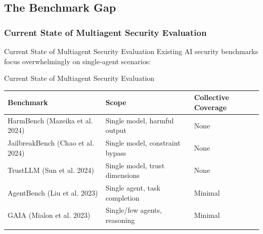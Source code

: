 \documentclass[
  ignorenonframetext,
]{beamer}
\newcounter{none} %
\begin{document}
\begin{frame}
\end{frame}

\subsection{The Benchmark Gap}\label{sec:benchmark-gap}

\subsubsection{Current State of Multiagent Security
Evaluation}\label{sec:current-benchmarks}

\begin{frame}[allowframebreaks]{Current State of Multiagent Security
Evaluation}
Existing AI security benchmarks focus overwhelmingly on single-agent
scenarios:

\end{frame}

\begin{frame}[allowframebreaks]{Current State of Multiagent Security
Evaluation}
{\def\LTcaptype{none} %
\begin{longtable}[]{@{}
  >{\raggedright\arraybackslash}p{}
  >{\raggedright\arraybackslash}p{}
  >{\raggedright\arraybackslash}p{}@{}}
\toprule\noalign{}
\begin{minipage}[b]{\linewidth}\raggedright
Benchmark
\end{minipage} & \begin{minipage}[b]{\linewidth}\raggedright
Scope
\end{minipage} & \begin{minipage}[b]{\linewidth}\raggedright
Collective Coverage
\end{minipage} \\
\midrule\noalign{}
\endhead
HarmBench ({Mazeika et al.} 2024) & Single model, harmful output &
None \\
JailbreakBench (Chao et al. 2024) & Single model, constraint bypass &
None \\
TrustLLM ({Sun et al.} 2024) & Single model, trust dimensions & None \\
AgentBench ({Liu et al.} 2023) & Single agent, task completion &
Minimal \\
GAIA ({Mialon et al.} 2023) & Single/few agents, reasoning & Minimal \\
\bottomrule\noalign{}
\end{longtable}
}

\end{frame}
\end{document}
